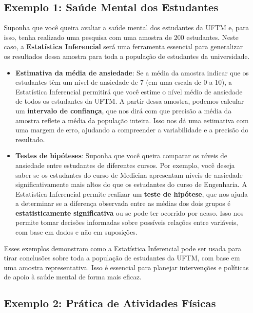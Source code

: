 \documentclass[
]{book}
\begin{document}
\subsection{\texorpdfstring{Exemplo 1: \textbf{Saúde Mental dos Estudantes}}{Exemplo 1: Saúde Mental dos Estudantes}}\label{exemplo-1-sauxfade-mental-dos-estudantes-1}

Suponha que você queira avaliar a saúde mental dos estudantes da UFTM e, para isso, tenha realizado uma pesquisa com uma amostra de 200 estudantes. Neste caso, a \textbf{Estatística Inferencial} será uma ferramenta essencial para generalizar os resultados dessa amostra para toda a população de estudantes da universidade.

\begin{itemize}
\item
  \textbf{Estimativa da média de ansiedade}: Se a média da amostra indicar que os estudantes têm um nível de ansiedade de 7 (em uma escala de 0 a 10), a Estatística Inferencial permitirá que você estime o nível médio de ansiedade de todos os estudantes da UFTM. A partir dessa amostra, podemos calcular um \textbf{intervalo de confiança}, que nos dirá com que precisão a média da amostra reflete a média da população inteira. Isso nos dá uma estimativa com uma margem de erro, ajudando a compreender a variabilidade e a precisão do resultado.
\item
  \textbf{Testes de hipóteses}: Suponha que você queira comparar os níveis de ansiedade entre estudantes de diferentes cursos. Por exemplo, você deseja saber se os estudantes do curso de Medicina apresentam níveis de ansiedade significativamente mais altos do que os estudantes do curso de Engenharia. A Estatística Inferencial permite realizar um \textbf{teste de hipótese}, que nos ajuda a determinar se a diferença observada entre as médias dos dois grupos é \textbf{estatisticamente significativa} ou se pode ter ocorrido por acaso. Isso nos permite tomar decisões informadas sobre possíveis relações entre variáveis, com base em dados e não em suposições.
\end{itemize}

Esses exemplos demonstram como a Estatística Inferencial pode ser usada para tirar conclusões sobre toda a população de estudantes da UFTM, com base em uma amostra representativa. Isso é essencial para planejar intervenções e políticas de apoio à saúde mental de forma mais eficaz.

\subsection{\texorpdfstring{Exemplo 2: \textbf{Prática de Atividades Físicas}}{Exemplo 2: Prática de Atividades Físicas}}\label{exemplo-2-pruxe1tica-de-atividades-fuxedsicas-1}
\end{document}
